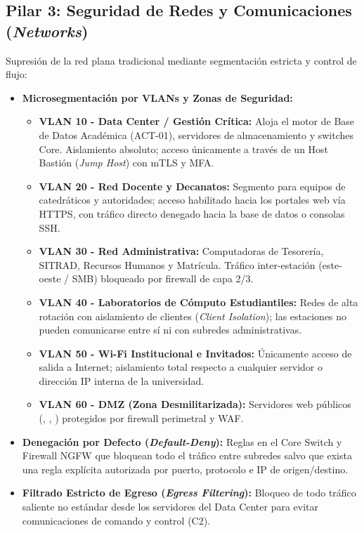 \subsection*{Pilar 3: Seguridad de Redes y Comunicaciones (\textit{Networks})}
Supresión de la red plana tradicional mediante segmentación estricta y control de flujo:
\begin{itemize}
    \item \textbf{Microsegmentación por VLANs y Zonas de Seguridad:}
    \begin{itemize}
        \item \textbf{VLAN 10 - Data Center / Gestión Crítica:} Aloja el motor de Base de Datos Académica (ACT-01), servidores de almacenamiento y switches Core. Aislamiento absoluto; acceso únicamente a través de un Host Bastión (\textit{Jump Host}) con mTLS y MFA.
        \item \textbf{VLAN 20 - Red Docente y Decanatos:} Segmento para equipos de catedráticos y autoridades; acceso habilitado hacia los portales web vía HTTPS, con tráfico directo denegado hacia la base de datos o consolas SSH.
        \item \textbf{VLAN 30 - Red Administrativa:} Computadoras de Tesorería, SITRAD, Recursos Humanos y Matrícula. Tráfico inter-estación (este-oeste / SMB) bloqueado por firewall de capa 2/3.
        \item \textbf{VLAN 40 - Laboratorios de Cómputo Estudiantiles:} Redes de alta rotación con aislamiento de clientes (\textit{Client Isolation}); las estaciones no pueden comunicarse entre sí ni con subredes administrativas.
        \item \textbf{VLAN 50 - Wi-Fi Institucional e Invitados:} Únicamente acceso de salida a Internet; aislamiento total respecto a cualquier servidor o dirección IP interna de la universidad.
        \item \textbf{VLAN 60 - DMZ (Zona Desmilitarizada):} Servidores web públicos (, , ) protegidos por firewall perimetral y WAF.
    \end{itemize}
    \item \textbf{Denegación por Defecto (\textit{Default-Deny}):} Reglas en el Core Switch y Firewall NGFW que bloquean todo el tráfico entre subredes salvo que exista una regla explícita autorizada por puerto, protocolo e IP de origen/destino.
    \item \textbf{Filtrado Estricto de Egreso (\textit{Egress Filtering}):} Bloqueo de todo tráfico saliente no estándar desde los servidores del Data Center para evitar comunicaciones de comando y control (C2).
\end{itemize}

